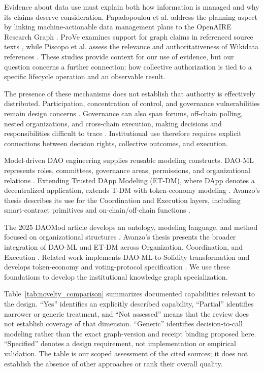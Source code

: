 \documentclass[journal]{IEEEtran}
\begin{document}
Evidence about data use must explain both how information is managed
and why its claims deserve consideration. Papadopoulou et al. address
the planning aspect by linking machine-actionable data management plans
to the OpenAIRE Research Graph \cite{papadopoulou2023argos}.
ProVe examines support for graph claims in referenced source texts
\cite{amaral2022prove}, while Piscopo et al. assess the relevance and
authoritativeness of Wikidata references
\cite{Piscopo2017WikidataProvenance}. These studies provide context for
our use of evidence, but our question concerns a further connection:
how collective authorization is tied to a specific lifecycle operation
and an observable result.

The presence of these mechanisms does not establish that authority
is effectively distributed. Participation, concentration of
control, and governance vulnerabilities remain design concerns
\cite{Han2025DAOReview}. Governance can also span forums,
off-chain polling, nested organizations, and cross-chain
execution, making decisions and responsibilities difficult
to trace \cite{Weidener2026Metagovernance}. Institutional use
therefore requires explicit connections between decision rights,
collective outcomes, and execution.

Model-driven DAO engineering supplies reusable modeling
constructs. DAO-ML represents roles, committees, governance
areas, permissions, and organizational relations
\cite{Avanzo2024DAOML}. Extending Trusted DApp Modeling
(ET-DM), where DApp denotes a decentralized application,
extends T-DM with token-economy modeling
\cite{Avanzo2025ETDM}. Avanzo's thesis describes its use
for the Coordination and Execution layers, including
smart-contract primitives and on-chain/off-chain functions
\cite{Avanzo2025Thesis}.

The 2025 DAOMod article develops an ontology, modeling
language, and method focused on organizational structures
\cite{Avanzo2025DAOMod}. Avanzo's thesis presents the broader
integration of DAO-ML and ET-DM across Organization,
Coordination, and Execution \cite{Avanzo2025Thesis}.
Related work implements DAO-ML-to-Solidity transformation
\cite{Avanzo2025DAOMLtoSolidity} and develops token-economy
and voting-protocol specification
\cite{Avanzo2026DAOModCoordination}. We use these foundations
to develop the institutional knowledge graph specialization.

Table~\ref{tab:novelty_comparison} summarizes documented
capabilities relevant to the design. ``Yes'' identifies an
explicitly described capability, ``Partial'' identifies narrower
or generic treatment, and ``Not assessed'' means that the
review does not establish coverage of that dimension.
``Generic'' identifies decision-to-call modeling rather than
the exact graph-version and receipt binding proposed here.
``Specified'' denotes a design requirement, not implementation
or empirical validation. The table is our scoped assessment
of the cited sources; it does not establish the absence of
other approaches or rank their overall quality.
\end{document}
